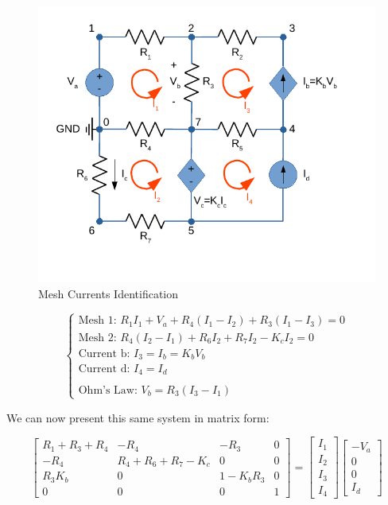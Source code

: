 \begin{figure}[h] \centering
  \includegraphics[width=0.7\linewidth]{MeshMethod.pdf}
  \caption{Mesh Currents Identification}
  \label{fig:MeshMethod}
\end{figure}

$$
\begin{cases}
  \text{Mesh 1: } R_{1}I_{1}+V_{a}+R_{4}(I_{1}-I_{2})+R_{3}(I_{1}-I_{3}) = 0\\
  \text{Mesh 2: } R_{4}(I_{2}-I_{1})+R_{6}I_{2}+R_{7}I_{2}-K_{c}I_{2} = 0\\
  \text{Current b: } I_{3} = I_{b} = K_{b}V_{b}\\
  \text{Current d: } I_{4} = I_{d}\\
  \\
  \text{Ohm's Law: } V_{b} = R_{3}(I_{3}-I_{1})
\end{cases}
$$

We can now present this same system in matrix form:

$$
\begin{bmatrix}
  R_{1}+R_{3}+R_{4} & -R_{4} & -R_{3} & 0 \\
  -R_{4} & R_{4}+R_{6}+R_{7}-K_{c} & 0 & 0\\
  R_{3}K_{b} & 0 & 1-K_{b}R_{3} & 0\\
  0 & 0 & 0 & 1
\end{bmatrix}
=
\begin{bmatrix}
  I_{1}\\
  I_{2}\\
  I_{3}\\
  I_{4}
\end{bmatrix}
\begin{bmatrix}
  -V_{a}\\
  0\\
  0\\
  I_{d}
\end{bmatrix}
$$

